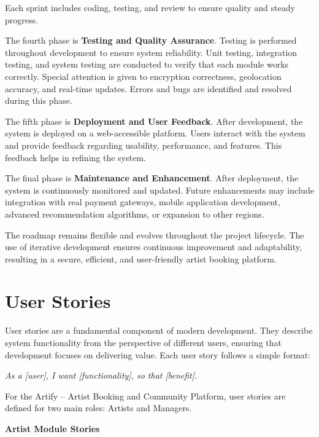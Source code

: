 \documentclass[12pt,a4paper]{report}
\begin{document}
Each sprint includes coding, testing, and review to ensure quality and steady progress.

The fourth phase is \textbf{Testing and Quality Assurance}. Testing is performed throughout development to ensure system reliability. Unit testing, integration testing, and system testing are conducted to verify that each module works correctly. Special attention is given to encryption correctness, geolocation accuracy, and real-time updates. Errors and bugs are identified and resolved during this phase.

The fifth phase is \textbf{Deployment and User Feedback}. After development, the system is deployed on a web-accessible platform. Users interact with the system and provide feedback regarding usability, performance, and features. This feedback helps in refining the system.

The final phase is \textbf{Maintenance and Enhancement}. After deployment, the system is continuously monitored and updated. Future enhancements may include integration with real payment gateways, mobile application development, advanced recommendation algorithms, or expansion to other regions.

The roadmap remains flexible and evolves throughout the project lifecycle. The use of iterative development ensures continuous improvement and adaptability, resulting in a secure, efficient, and user-friendly artist booking platform.

\section{User Stories}

User stories are a fundamental component of modern development. They describe system functionality from the perspective of different users, ensuring that development focuses on delivering value. Each user story follows a simple format:

\textit{As a [user], I want [functionality], so that [benefit].}

For the Artify -- Artist Booking and Community Platform, user stories are defined for two main roles: Artists and Managers.

\textbf{Artist Module Stories}
\end{document}
